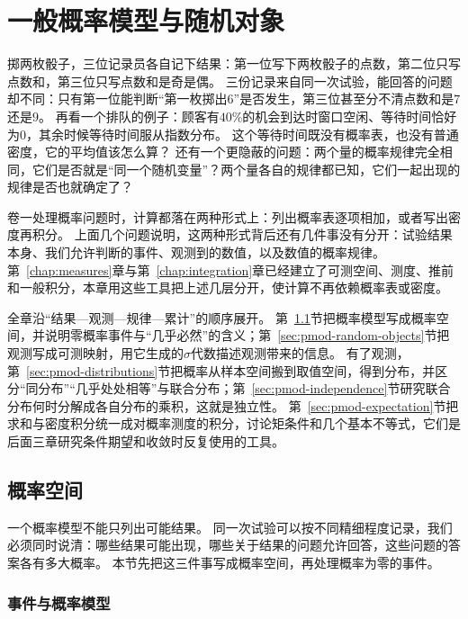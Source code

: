 \chapter{一般概率模型与随机对象}
\label{chap:probability-models}

掷两枚骰子，三位记录员各自记下结果：第一位写下两枚骰子的点数，第二位只写点数和，第三位只写点数和是奇是偶。
三份记录来自同一次试验，能回答的问题却不同：只有第一位能判断“第一枚掷出$6$”是否发生，第三位甚至分不清点数和是$7$还是$9$。
再看一个排队的例子：顾客有$40\%$的机会到达时窗口空闲、等待时间恰好为$0$，其余时候等待时间服从指数分布。
这个等待时间既没有概率表，也没有普通密度，它的平均值该怎么算？
还有一个更隐蔽的问题：两个量的概率规律完全相同，它们是否就是“同一个随机变量”？两个量各自的规律都已知，它们一起出现的规律是否也就确定了？

卷一处理概率问题时，计算都落在两种形式上：列出概率表逐项相加，或者写出密度再积分。
上面几个问题说明，这两种形式背后还有几件事没有分开：试验结果本身、我们允许判断的事件、观测到的数值，以及数值的概率规律。
第~\ref{chap:measures}章与第~\ref{chap:integration}章已经建立了可测空间、测度、推前和一般积分，本章用这些工具把上述几层分开，使计算不再依赖概率表或密度。

全章沿“结果—观测—规律—累计”的顺序展开。
第~\ref{sec:pmod-probability-space}节把概率模型写成概率空间，并说明零概率事件与“几乎必然”的含义；第~\ref{sec:pmod-random-objects}节把观测写成可测映射，用它生成的$\sigma$代数描述观测带来的信息。
有了观测，第~\ref{sec:pmod-distributions}节把概率从样本空间搬到取值空间，得到分布，并区分“同分布”“几乎处处相等”与联合分布；第~\ref{sec:pmod-independence}节研究联合分布何时分解成各自分布的乘积，这就是独立性。
第~\ref{sec:pmod-expectation}节把求和与密度积分统一成对概率测度的积分，讨论矩条件和几个基本不等式，它们是后面三章研究条件期望和收敛时反复使用的工具。

\section{概率空间}
\label{sec:pmod-probability-space}

一个概率模型不能只列出可能结果。
同一次试验可以按不同精细程度记录，我们必须同时说清：哪些结果可能出现，哪些关于结果的问题允许回答，这些问题的答案各有多大概率。
本节先把这三件事写成概率空间，再处理概率为零的事件。

\subsection{事件与概率模型}

